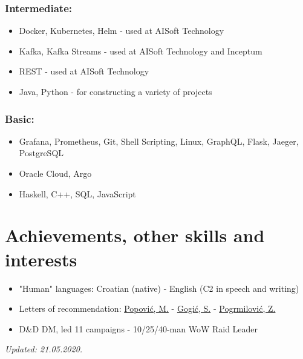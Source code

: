 \documentclass[a4paper]{article}
\newcommand{\bolditalicpair}
[2]
{\textbf{#1} \texorpdfstring{\hfill}{} \textit{#2}}
\begin{document}
\subsubsection{\bolditalicpair{Intermediate:}{}}

\begin{itemize}
  \item Docker, Kubernetes, Helm - used at AISoft Technology
  \item Kafka, Kafka Streams - used at AISoft Technology and Inceptum
  \item REST - used at AISoft Technology
  \item Java, Python - for constructing a variety of projects
\end{itemize}

\subsubsection{\bolditalicpair{Basic:}{}}

\begin{itemize}
  \item Grafana, Prometheus, Git, Shell Scripting, Linux, GraphQL, Flask, Jaeger, PostgreSQL
  \item Oracle Cloud, Argo
  \item Haskell, C++, SQL, JavaScript
\end{itemize}



\section{Achievements, other skills and interests}

\begin{itemize}
  \item "Human" languages: Croatian (native) - English (C2 in speech and writing)
  \item Letters of recommendation: \href{https://github.com/MislavJaksic/CV/blob/master/LoR/AISoft_Popovic.pdf}{Popović, M.} - \href{https://github.com/MislavJaksic/CV/blob/master/LoR/Atos_Gogic.pdf}{Gogić, S.} - \href{https://github.com/MislavJaksic/CV/blob/master/LoR/Atos_Pogrmilovic.pdf}{Pogrmilović, Z.}
  \item D\&D DM, led 11 campaigns - 10/25/40-man WoW Raid Leader
\end{itemize}

\bolditalicpair{}{Updated: 21.05.2020.}
\end{document}
